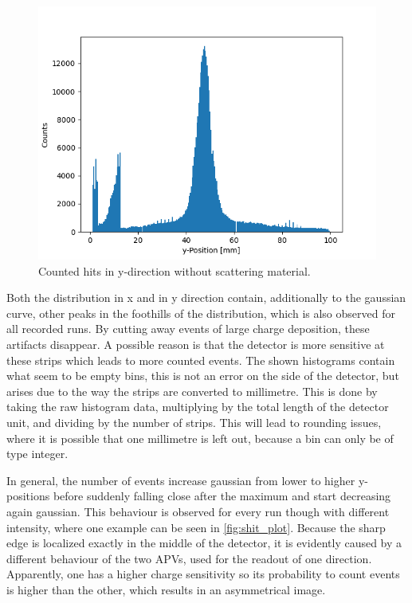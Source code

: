 \documentclass[sn-mathphys-num,iicol]{sn-jnl}
\theoremstyle{thmstyleone}
\theoremstyle{thmstyletwo}
\theoremstyle{thmstylethree}
\begin{document}
\begin{figure}
  \includegraphics[width=0.9\linewidth]{../src/elsa/finished_plots/unfiltered_noMaterial.png}
  \caption{Counted hits in y-direction without scattering material.}
  \label{fig:y_hist_notarget}
\end{figure}

Both the distribution in x and in y direction contain, additionally to the gaussian curve, other peaks in the foothills of the distribution, which is also observed for all recorded runs.
By cutting away events of large charge deposition, these artifacts disappear. 
A possible reason is that the detector is more sensitive at these strips which leads to more counted events.
The shown histograms contain what seem to be empty bins, this is not an error on the side of the detector,
but arises due to the way the strips are converted to millimetre.
This is done by taking the raw histogram data, multiplying by the total length of the detector unit, and dividing by the number of strips.
This will lead to rounding issues, where it is possible that one millimetre is left out, because a bin can only be of type integer.

In general, the number of events increase gaussian from lower to higher y-positions before suddenly falling close after the maximum and start decreasing again gaussian. 
This behaviour is observed for every run though with different intensity, where one example can be seen in \autoref{fig:shit_plot}. 
Because the sharp edge is localized exactly in the middle of the detector, it is evidently caused by a different behaviour of the two APVs, used for the readout of one direction. 
Apparently, one has a higher charge sensitivity so its probability to count events is higher than the other, which results in an asymmetrical image. 
\end{document}
